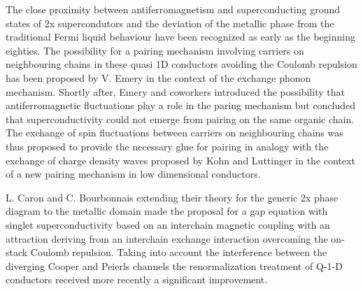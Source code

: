 \documentclass[11pt]{article} %
\begin{document}
The close proximity between antiferromagnetism and superconducting ground states of \tm2x supercondutors and the deviation of the metallic phase from the traditional Fermi liquid behaviour   have been recognized as early as the beginning eighties. The possibility for a pairing mechanism involving carriers on neighbouring chains in these quasi 1D conductors avoiding  the Coulomb repulsion  has been  proposed  by V. Emery  in the context of the exchange phonon mechanism\cite{Emery83}. Shortly after, Emery and coworkers introduced the possibility that antiferromagnetic fluctuations play a role in the paring mechanism\cite{Emery86,Beal86} but concluded that superconductivity could not emerge from pairing on the same organic chain. The exchange of spin fluctuations between carriers on neighbouring chains was thus proposed\cite{Emery86} to provide the necessary glue for pairing in analogy with  the exchange of charge density waves proposed by Kohn and Luttinger\cite{Kohn65} in the context of  a new pairing mechanism in low dimensional conductors.

L. Caron and C. Bourbonnais\cite{Bourbonnais86,Caron86} extending their theory for the generic \tm2x phase diagram to the metallic domain   made the  proposal for a gap equation with singlet superconductivity based on an interchain magnetic coupling with an attraction   deriving from an interchain exchange interaction overcoming the on-stack Coulomb repulsion. Taking into account the interference between the diverging Cooper and Peierls channels the renormalization treatment of Q-1-D conductors  received more recently a significant improvement\cite{Duprat01}. 
\end{document}
